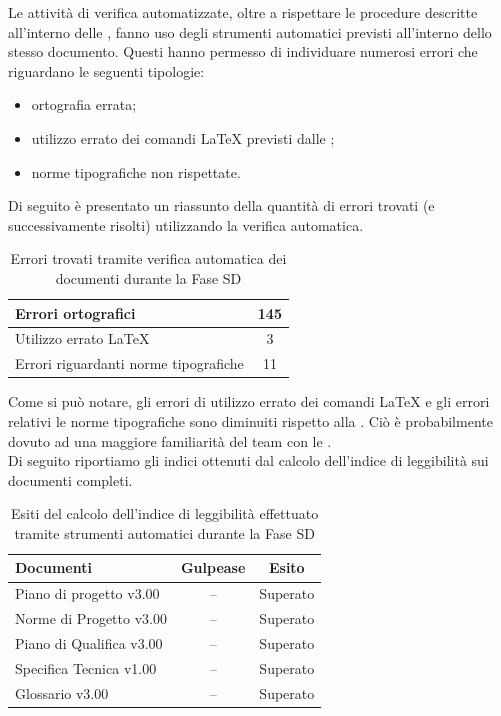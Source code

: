 			Le attività di verifica automatizzate, oltre a rispettare le procedure descritte all'interno delle , fanno uso degli strumenti automatici previsti all'interno dello stesso documento. Questi hanno permesso di individuare numerosi errori che riguardano le seguenti tipologie:
			\begin{itemize}
				\item ortografia errata;
				\item utilizzo errato dei comandi \LaTeX{} previsti dalle ;
				\item norme tipografiche non rispettate.
			\end{itemize}
			Di seguito è presentato un riassunto della quantità di errori trovati (e successivamente risolti) utilizzando la verifica automatica.
			\begin{table}[H]
					\centering
					\begin{tabu}{| l | c |}
						\hline
						Errori ortografici	&145	\\ \hline
						Utilizzo errato \LaTeX{}	&3	\\ \hline
						Errori riguardanti norme tipografiche	&11	\\ \hline
					\end{tabu}
					\caption{Errori trovati tramite verifica automatica dei documenti durante la Fase SD}
				\end{table}
				Come si può notare, gli errori di utilizzo errato dei comandi \LaTeX{} e gli errori relativi le norme tipografiche sono diminuiti rispetto alla . Ciò è probabilmente dovuto ad una maggiore familiarità del team con le \insdoc{Norme di Progetto v3.00}.\\
				Di seguito riportiamo gli indici ottenuti dal calcolo dell'indice di leggibilità sui documenti completi.
				\begin{table}[H]
					\centering
					\begin{tabu}{| l | c | c |}
							\hline
							Documenti 							& Gulpease	& Esito		\\ \hline \hline
							
							Piano di progetto v3.00				& -- 		& Superato  \\ \hline
							Norme di Progetto v3.00 			& --		& Superato  \\ \hline
							Piano di Qualifica v3.00 			& --		& Superato  \\ \hline
							Specifica Tecnica v1.00 			& --		& Superato  \\ \hline
							Glossario v3.00					 	& -- 		& Superato  \\ \hline
						\end{tabu}
					\caption{Esiti del calcolo dell'indice di leggibilità effettuato tramite strumenti automatici durante la Fase SD}
				\end{table}
